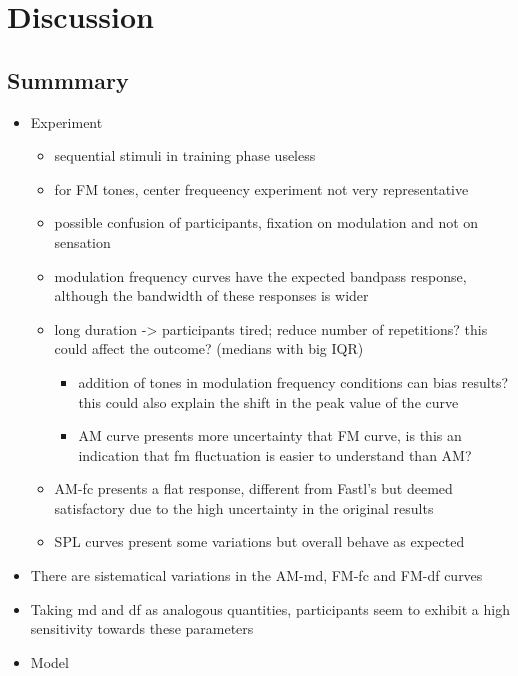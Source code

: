 \documentclass[../main.tex]{subfiles}
\begin{document}
\chapter{Discussion}

\section{Summmary}

\begin{itemize}
  \item Experiment
  \begin{itemize}
    \item sequential stimuli in training phase useless
    \item for FM tones, center frequeency experiment not very representative
    \item possible confusion of participants, fixation on modulation and not
      on sensation
    \item modulation frequency curves have the expected bandpass response,
      although the bandwidth of these responses is wider
    \item long duration -> participants tired; reduce number of repetitions?
      this could affect the outcome? (medians with big IQR)
    \begin{itemize}
      \item addition of tones in modulation frequency conditions can bias
        results? this could also explain the shift in the peak value of the
        curve
      \item AM curve presents more uncertainty that FM curve, is this an
        indication that fm fluctuation is easier to understand than AM?
    \end{itemize}
    \item AM-fc presents a flat response, different from Fastl's but deemed
      satisfactory due to the high uncertainty in the original results
    \item SPL curves present some variations but overall behave as expected
   \end{itemize}
    \item There are sistematical variations in the AM-md, FM-fc and FM-df curves
    \item Taking md and df as analogous quantities, participants seem to exhibit
      a high sensitivity towards these parameters
  \item Model
\end{itemize}
\end{document}
